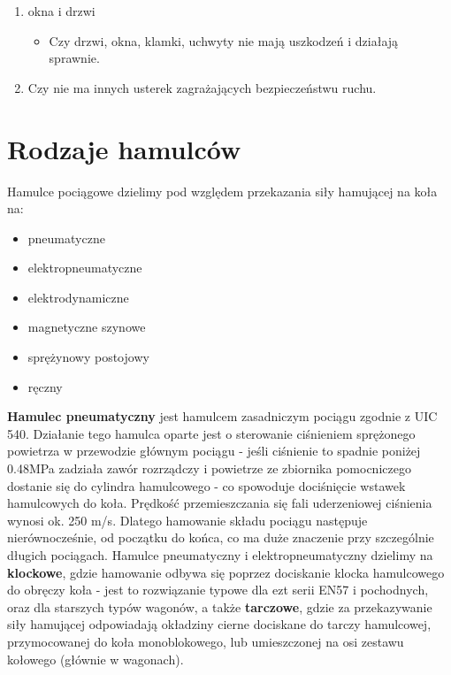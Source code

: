 \begin{enumerate}
\begin{itemize}
		\item Czy linki łączące pudło i ramę wózka, ramę wózka i obudowę maźnicy są kompletne, czy nie ma zwisających części taboru,
		
		
		\item Czy pudła pojazdow są wystarczająco szczelne i mocno połączone z podwoziem, czy numer i napisy na pojazdach są prawidłowe.
		
	\end{itemize}
	
	\item okna i drzwi
	\begin{itemize}
		\item Czy drzwi, okna, klamki, uchwyty nie mają uszkodzeń i działają sprawnie.
	\end{itemize}
		
	
	\item Czy nie ma innych usterek zagrażających bezpieczeństwu ruchu. 
\end{enumerate}


\chapter{Rodzaje hamulców}

Hamulce pociągowe dzielimy pod względem przekazania siły hamującej na koła na:

\begin{itemize}
	\item pneumatyczne
	\item elektropneumatyczne
	\item elektrodynamiczne
	\item magnetyczne szynowe
	\item sprężynowy postojowy
	\item ręczny 
\end{itemize}

\textbf{Hamulec pneumatyczny} jest hamulcem zasadniczym pociągu zgodnie z UIC 540. Działanie tego hamulca oparte jest o sterowanie ciśnieniem sprężonego powietrza w przewodzie głównym pociągu - jeśli ciśnienie to spadnie poniżej 0.48MPa zadziała zawór rozrządczy i powietrze ze zbiornika pomocniczego dostanie się do cylindra hamulcowego - co spowoduje dociśnięcie wstawek hamulcowych do koła. Prędkość przemieszczania się fali uderzeniowej ciśnienia wynosi ok. 250 m/s. Dlatego hamowanie składu pociągu następuje nierównocześnie, od początku do końca, co ma duże znaczenie przy szczególnie długich pociągach.
Hamulce pneumatyczny i elektropneumatyczny dzielimy na \textbf{klockowe}, gdzie hamowanie odbywa się poprzez dociskanie klocka hamulcowego do obręczy koła - jest to rozwiązanie typowe dla ezt serii EN57 i pochodnych, oraz dla starszych typów wagonów, a także \textbf{tarczowe}, gdzie za przekazywanie siły hamującej odpowiadają okładziny cierne dociskane do tarczy hamulcowej, przymocowanej do koła monoblokowego, lub umieszczonej na osi zestawu kołowego (głównie w wagonach).

